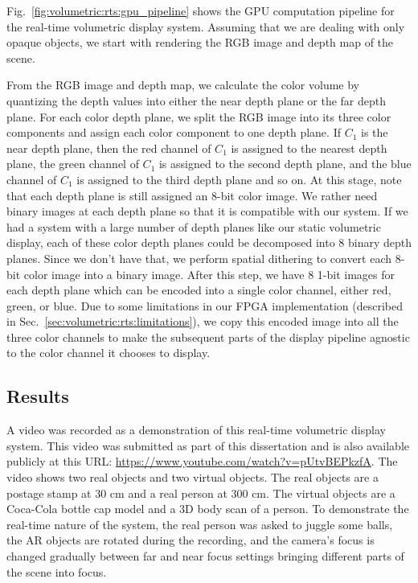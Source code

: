 Fig.~\ref{fig:volumetric:rts:gpu_pipeline} shows the GPU computation pipeline for the real-time volumetric display system. Assuming that we are dealing with only opaque objects, we start with rendering the RGB image and depth map of the scene.

From the RGB image and depth map, we calculate the color volume by quantizing the depth values into either the near depth plane or the far depth plane.
For each color depth plane, we split the RGB image into its three color components and assign each color component to one depth plane. 
If $C_1$ is the near depth plane, then the red channel of $C_1$ is assigned to the nearest depth plane, the green channel of $C_1$ is assigned to the second depth plane, and the blue channel of $C_1$ is assigned to the third depth plane and so on.
At this stage, note that each depth plane is still assigned an 8-bit color image.
We rather need binary images at each depth plane so that it is compatible with our system. 
If we had a system with a large number of depth planes like our static volumetric display, each of these color depth planes could be decomposed into 8 binary depth planes.
Since we don't have that, we perform spatial dithering to convert each 8-bit color image into a binary image. 
After this step, we have 8 1-bit images for each depth plane which can be encoded into a single color channel, either red, green, or blue.
Due to some limitations in our FPGA implementation (described in Sec.~\ref{sec:volumetric:rts:limitations}), we copy this encoded image into all the three color channels to make the subsequent parts of the display pipeline agnostic to the color channel it chooses to display.

\subsection{Results}
A video was recorded as a demonstration of this real-time volumetric display system. This video was submitted as part of this dissertation and is also available publicly at this URL: \url{https://www.youtube.com/watch?v=pUtvBEPkzfA}. 
The video shows two real objects and two virtual objects. 
The real objects are a postage stamp at 30 cm and a real person at 300 cm.
The virtual objects are a Coca-Cola bottle cap model and a 3D body scan of a person.
To demonstrate the real-time nature of the system, the real person was asked to juggle some balls, the AR objects are rotated during the recording, and the camera's focus is changed gradually between far and near focus settings bringing different parts of the scene into focus.

